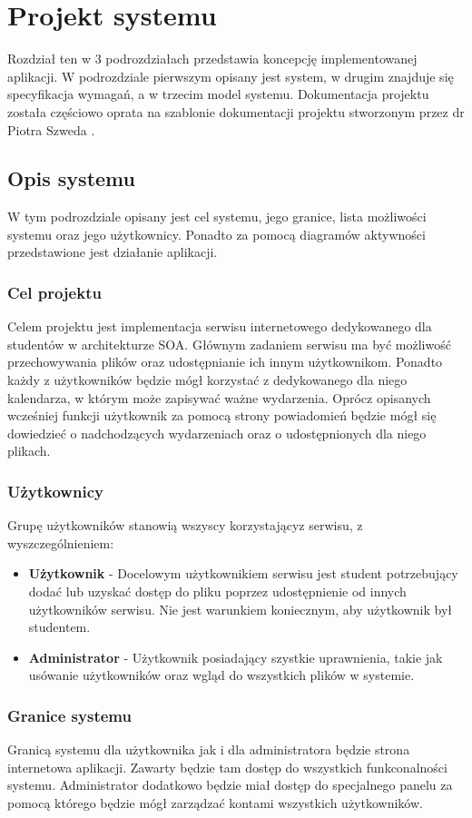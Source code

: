 \chapter{Projekt systemu}
\label{cha:projektSystemu}
Rozdział ten w 3 podrozdziałach przedstawia koncepcję implementowanej aplikacji. W podrozdziale pierwszym opisany jest system, w drugim znajduje się specyfikacja wymagań, a w trzecim model systemu. Dokumentacja projektu została częściowo oprata na szablonie dokumentacji projektu stworzonym przez dr Piotra Szweda \cite{DOC01}.
\section{Opis systemu}
W tym podrozdziale opisany jest cel systemu, jego granice, lista możliwości systemu oraz jego użytkownicy. Ponadto za pomocą diagramów aktywności przedstawione jest działanie aplikacji.
\subsection{Cel projektu}
Celem projektu jest implementacja serwisu internetowego dedykowanego dla studentów w architekturze SOA. Głównym zadaniem serwisu ma być możliwość przechowywania plików oraz udostępnianie ich innym użytkownikom. Ponadto każdy z użytkowników będzie mógł korzystać z dedykowanego dla niego kalendarza, w którym może zapisywać ważne wydarzenia. Oprócz opisanych wcześniej funkcji użytkownik za pomocą strony powiadomień będzie mógł się dowiedzieć o nadchodzących wydarzeniach oraz o udostępnionych dla niego plikach.

\subsection{Użytkownicy}
Grupę użytkowników stanowią wszyscy korzystającyz serwisu, z wyszczególnieniem:
\begin{itemize}
	\item \textbf{Użytkownik} - Docelowym użytkownikiem serwisu jest student potrzebujący dodać lub uzyskać dostęp do pliku poprzez udostępnienie od innych użytkowników serwisu. Nie jest warunkiem koniecznym, aby użytkownik był studentem.
	\item \textbf{Administrator} - Użytkownik posiadający szystkie uprawnienia, takie jak usówanie użytkowników oraz wgląd do wszystkich plików w systemie.
\end{itemize}

\subsection{Granice systemu}
Granicą systemu dla użytkownika jak i dla administratora będzie strona internetowa aplikacji. Zawarty będzie tam dostęp do wszystkich funkconalności systemu. Administrator dodatkowo będzie miał dostęp do specjalnego panelu za pomocą którego będzie mógł zarządzać kontami wszystkich użytkowników.

